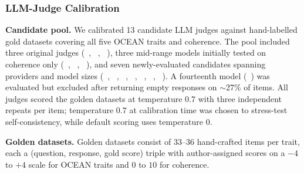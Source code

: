\subsubsection{LLM-Judge Calibration}\label{sec:appendix-e-judges}


\textbf{Candidate pool.}
We calibrated 13 candidate LLM judges against hand-labelled gold datasets covering all five OCEAN traits and coherence. The pool included three original judges (\GeminiTwoPointZeroFlash~\citep{google2025gemini20flash}, \KimiKTwo~\citep{moonshot2024kimik2}, \GPTFiveMini~\citep{singh2026gpt5}), three mid-range models initially tested on coherence only (\ClaudeThreePointFiveHaiku~\citep{anthropic2024claude35haiku}, \DeepSeekVThree~\citep{deepseek2024v3}, \LlamaFourScout~\citep{meta2025llama4scout}), and seven newly-evaluated candidates spanning providers and model sizes (\QwenThreeSizeTwoThreeFiveB~\citep{qwen2025qwen3}, \QwenTwoPointFiveSizeSeventyTwoB~\citep{qwen2024qwen25}, \LlamaThreePointThreeSizeSeventyBInstruct~\citep{meta2024llama33}, \GemmaFourSizeTwentySixB~\citep{google2026gemma4}, \MistralSmallThreePointTwoSizeTwentyFourB~\citep{mistral2025small32}, \GPTFourPointOneNano~\citep{openai2025gpt41}, \GeminiTwoPointZeroFlashLite~\citep{google2025gemini20flash}). A fourteenth model (\GPTFiveNano~\citep{singh2026gpt5}) was evaluated but excluded after returning empty responses on $\sim$27\% of items. All judges scored the golden datasets at temperature $0.7$ with three independent repeats per item; temperature $0.7$ at calibration time was chosen to stress-test self-consistency, while default scoring uses temperature $0$.

\textbf{Golden datasets.}
Golden datasets consist of 33--36 hand-crafted items per trait, each a (question, response, gold score) triple with author-assigned scores on a $-4$ to $+4$ scale for OCEAN traits and $0$ to $10$ for coherence.

